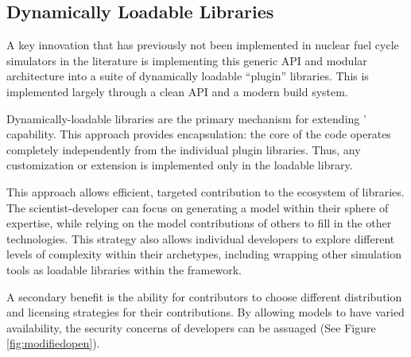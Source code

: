 \subsection{Dynamically Loadable Libraries}

A key innovation that has previously not been implemented in nuclear fuel cycle 
simulators in the literature is implementing this generic API and modular 
architecture into a suite of dynamically loadable ``plugin'' libraries.
This is implemented largely through a clean API and a modern build system.

Dynamically-loadable libraries are the primary mechanism for extending \Cyclus' capability. 
This approach provides encapsulation: the core of the code operates
completely independently from the individual plugin libraries. Thus, any
customization or extension is implemented only in the loadable
library. 

This approach allows efficient, targeted contribution to the ecosystem of libraries.  The 
scientist-developer can focus on generating a model within their
sphere of expertise, while relying on the model contributions of others to fill 
in the other technologies.  This strategy also allows individual developers to
explore different levels of complexity within their archetypes, including
wrapping other simulation tools as loadable libraries within the \Cyclus
framework.

A secondary benefit is the ability for
contributors to choose different distribution and licensing strategies
for their contributions. By allowing models to have varied
availability, the security concerns of developers can be
assuaged (See Figure \ref{fig:modifiedopen}).

